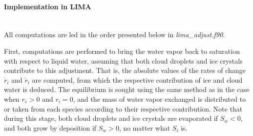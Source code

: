 {\paragraph{Implementation in LIMA}
~\\
All computations are led in the order presented below in \emph{lima\_adjust.f90}.

First, computations are performed to bring the water vapor back to saturation with respect to liquid water, assuming that both cloud droplets and ice crystals contribute to this adjustment. That is, the absolute values of the rates of change $\dot{r}_i$ and $\dot{r}_i$ are computed, from which the respective contribution of ice and cloud water is deduced. The equilibrium is sought using the same method as in the case when $r_c>0$ and $r_i=0$, and the mass of water vapor exchanged is distributed to or taken from each species according to their respective contribution. Note that during this stage, both cloud droplets and ice crystals are evaporated if $S_w<0$, and both grow by deposition if $S_w>0$, no matter what $S_i$ is.

}
